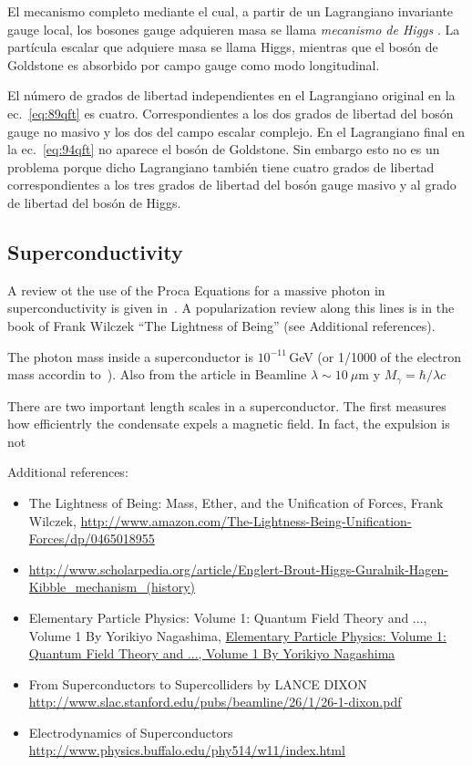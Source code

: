 \begin{frame}
El mecanismo completo mediante el cual, a partir de un Lagrangiano invariante gauge local, los bosones gauge adquieren masa se llama \emph{mecanismo de Higgs} \cite{Higgs:1964pj}. La partícula escalar que adquiere masa se llama Higgs, mientras que el bosón de Goldstone es absorbido por campo gauge como modo longitudinal. 

El número de grados de libertad independientes en el Lagrangiano original en la ec.~\eqref{eq:89qft} es cuatro. Correspondientes a los dos grados de libertad del bosón gauge no masivo y los dos del campo escalar complejo. En el Lagrangiano final en la ec.~\eqref{eq:94qft} no aparece el bosón de Goldstone. Sin embargo esto no es un problema porque dicho Lagrangiano también tiene cuatro grados de libertad correspondientes a  los tres grados de libertad del bosón gauge masivo y al grado de libertad del bosón de Higgs. 

\end{frame}

\subsection{Superconductivity}

A review ot the use of the Proca Equations for a massive photon in superconductivity is given in~\cite{massivephoton}. A popularization review along this lines is in the book of Frank Wilczek ``The Lightness of Being'' (see Additional references).

The photon mass inside a superconductor is $10^{-11}\,$GeV (or 1/1000 of the electron mass accordin to~\cite{massivephoton}). Also from the article in Beamline $\lambda\sim 10\ \mu\text{m}$ y $M_\gamma=\hbar/\lambda c$ %

There are two important length scales in a superconductor. The first measures how efficientrly the condensate expels a magnetic field. In fact, the expulsion is not 

Additional references:
\begin{itemize}
\item The Lightness of Being: Mass, Ether, and the Unification of Forces,
Frank Wilczek, \url{http://www.amazon.com/The-Lightness-Being-Unification-Forces/dp/0465018955}
\item \url{http://www.scholarpedia.org/article/Englert-Brout-Higgs-Guralnik-Hagen-Kibble_mechanism_(history)}
\item Elementary Particle Physics: Volume 1: Quantum Field Theory and ..., Volume 1
 By Yorikiyo Nagashima, \url{Elementary Particle Physics: Volume 1: Quantum Field Theory and ..., Volume 1
 By Yorikiyo Nagashima}
\item From Superconductors 
to Supercolliders
by LANCE DIXON \url{http://www.slac.stanford.edu/pubs/beamline/26/1/26-1-dixon.pdf}
\item Electrodynamics of Superconductors \url{http://www.physics.buffalo.edu/phy514/w11/index.html}
\end{itemize}




